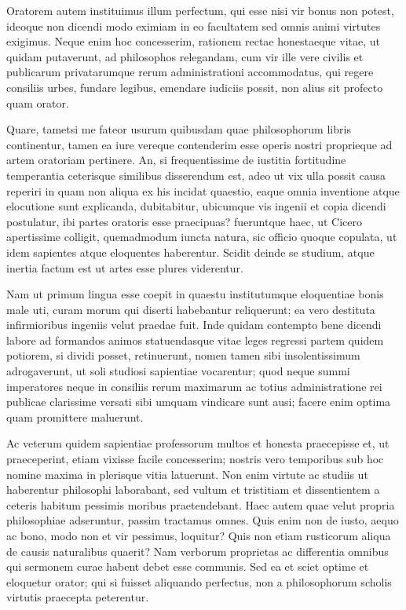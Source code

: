 Oratorem autem instituimus illum perfectum, qui esse nisi vir bonus non potest, ideoque non dicendi modo eximiam in eo facultatem sed omnis animi virtutes exigimus. Neque enim hoc concesserim, rationem rectae honestaeque vitae, ut quidam putaverunt, ad philosophos relegandam, cum vir ille vere civilis et publicarum privatarumque rerum administrationi accommodatus, qui regere consiliis urbes, fundare legibus, emendare iudiciis possit, non alius sit profecto quam orator. 

Quare, tametsi me fateor usurum quibusdam quae philosophorum libris continentur, tamen ea iure vereque contenderim esse operis nostri proprieque ad artem oratoriam pertinere. An, si frequentissime de iustitia fortitudine temperantia ceterisque similibus disserendum est, adeo ut vix ulla possit causa reperiri in quam non aliqua ex his incidat quaestio, eaque omnia inventione atque elocutione sunt explicanda, dubitabitur, ubicumque vis ingenii et copia dicendi postulatur, ibi partes oratoris esse praecipuas? fueruntque haec, ut Cicero apertissime colligit, quemadmodum iuncta natura, sic officio quoque copulata, ut idem sapientes atque eloquentes haberentur. Scidit deinde se studium, atque inertia factum est ut artes esse plures viderentur. 

Nam ut primum lingua esse coepit in quaestu institutumque eloquentiae bonis male uti, curam morum qui diserti habebantur reliquerunt; ea vero destituta infirmioribus ingeniis velut praedae fuit. Inde quidam contempto bene dicendi labore ad formandos animos statuendasque vitae leges regressi partem quidem potiorem, si dividi posset, retinuerunt, nomen tamen sibi insolentissimum adrogaverunt, ut soli studiosi sapientiae vocarentur; quod neque summi imperatores neque in consiliis rerum maximarum ac totius administratione rei publicae clarissime versati sibi umquam vindicare sunt ausi; facere enim optima quam promittere maluerunt. 

Ac veterum quidem sapientiae professorum multos et honesta praecepisse et, ut praeceperint, etiam vixisse facile concesserim; nostris vero temporibus sub hoc nomine maxima in plerisque vitia latuerunt. Non enim virtute ac studiis ut haberentur philosophi laborabant, sed vultum et tristitiam et dissentientem a ceteris habitum pessimis moribus praetendebant. Haec autem quae velut propria philosophiae adseruntur, passim tractamus omnes. Quis enim non de iusto, aequo ac bono, modo non et vir pessimus, loquitur? Quis non etiam rusticorum aliqua de causis naturalibus quaerit? Nam verborum proprietas ac differentia omnibus qui sermonem curae habent debet esse communis. Sed ea et sciet optime et eloquetur orator; qui si fuisset aliquando perfectus, non a philosophorum scholis virtutis praecepta peterentur. 

